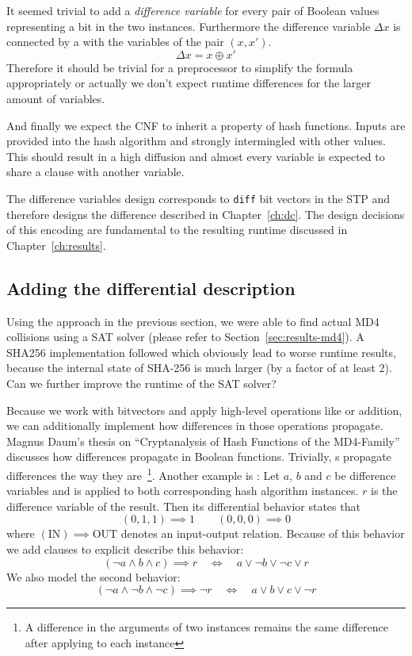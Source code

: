 It seemed trivial to add a \emph{difference variable} for every pair of Boolean
values representing a bit in the two instances. Furthermore the difference
variable $\Delta x$ is connected by a  with the variables of the pair $(x, x')$.
\[ \Delta x = x \oplus x' \]
Therefore it should be trivial for a preprocessor to simplify the formula
appropriately or actually we don't expect runtime differences for the larger
amount of variables.

And finally we expect the CNF to inherit a property of hash functions.
Inputs are provided into the hash algorithm and strongly intermingled
with other values. This should result in a high diffusion and almost every
variable is expected to share a clause with another variable.

The difference variables design corresponds to \texttt{diff} bit vectors
in the STP and therefore designs the difference described in Chapter~\ref{ch:dc}.
The design decisions of this encoding are fundamental to the resulting
runtime discussed in Chapter~\ref{ch:results}.

\subsection{Adding the differential description}
\label{sec:enc-diff-desc}
%
Using the approach in the previous section, we were able to find actual MD4 collisions
using a SAT solver (please refer to Section~\ref{sec:results-md4}).
A SHA256 implementation followed which obviously lead to worse
runtime results, because the internal state of SHA-256 is much larger
(by a factor of at least 2). Can we further improve the runtime of the SAT solver?

Because we work with bitvectors and apply high-level operations like  or addition,
we can additionally implement how differences in those operations propagate.
Magnus Daum's thesis on \enquote{Cryptanalysis of Hash Functions of the
MD4-Family}~\cite[Table 4.4]{daum2005cryptanalysis} discusses how differences propagate in
Boolean functions. Trivially, s propagate differences the way they are~\footnote{
A difference in the arguments of two  instances remains the same difference
after applying  to each instance}. Another example is :
Let $a$, $b$ and $c$ be difference variables and  is applied to both corresponding
hash algorithm instances. $r$ is the difference variable of the result.
Then its differential behavior states that
\[ (0, 1, 1) \implies 1 \qquad (0, 0, 0) \implies 0 \]
where $(\text{IN}) \implies \text{OUT}$ denotes an input-output relation.
Because of this behavior we add clauses to explicit describe this behavior:
\[ (\neg a \land b \land c) \implies r \quad \iff \quad a \lor \neg b \lor \neg c \lor r \]
We also model the second behavior:
\[ (\neg a \land \neg b \land \neg c) \implies \neg r \quad \iff \quad a \lor b \lor c \lor \neg r \]

